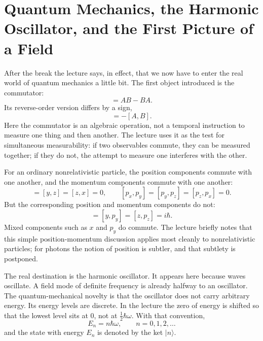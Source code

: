 \section{Quantum Mechanics, the Harmonic Oscillator, and the First Picture of a Field}

After the break the lecture says, in effect, that we now have to enter the real world of quantum mechanics a little bit. The first object introduced is the commutator:
\begin{equation}
[A,B]=AB-BA.
\end{equation}
Its reverse-order version differs by a sign,
\begin{equation}
[B,A]=-[A,B].
\end{equation}
Here the commutator is an algebraic operation, not a temporal instruction to measure one thing and then another. The lecture uses it as the test for simultaneous measurability: if two observables commute, they can be measured together; if they do not, the attempt to measure one interferes with the other.

For an ordinary nonrelativistic particle, the position components commute with one another, and the momentum components commute with one another:
\begin{equation}
[x,y]=[y,z]=[z,x]=0,
\qquad
[p_x,p_y]=[p_y,p_z]=[p_z,p_x]=0.
\end{equation}
But the corresponding position and momentum components do not:
\begin{equation}
[x,p_x]=[y,p_y]=[z,p_z]=i\hbar.
\end{equation}
Mixed components such as \(x\) and \(p_y\) do commute. The lecture briefly notes that this simple position-momentum discussion applies most cleanly to nonrelativistic particles; for photons the notion of position is subtler, and that subtlety is postponed.

The real destination is the harmonic oscillator. It appears here because waves oscillate. A field mode of definite frequency is already halfway to an oscillator. The quantum-mechanical novelty is that the oscillator does not carry arbitrary energy. Its energy levels are discrete. In the lecture the zero of energy is shifted so that the lowest level sits at \(0\), not at \(\frac12\hbar\omega\). With that convention,
\begin{equation}
E_n = n\hbar\omega,
\qquad
n=0,1,2,\dots
\end{equation}
and the state with energy \(E_n\) is denoted by the ket \(|n\rangle\).

